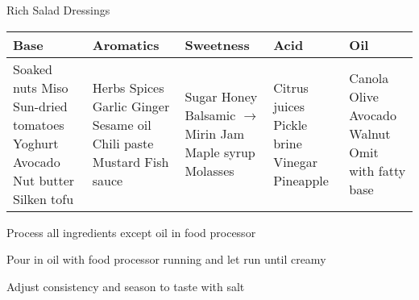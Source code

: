 \begin{densecard}{Rich Salad Dressings}{\vegetarian{}}
\begin{tabularx}{\textwidth}{@{}XXXXX@{}}
\toprule
Base & Aromatics & Sweetness & Acid & Oil \\
\midrule
Soaked nuts\newline
Miso\newline
Sun-dried tomatoes\newline
Yoghurt\newline
Avocado\newline
Nut butter\newline
Silken tofu
& %
Herbs\newline
Spices\newline
Garlic\newline
Ginger\newline
Sesame oil\newline
Chili paste\newline
Mustard\newline
Fish sauce
& %
Sugar\newline
Honey\newline
Balsamic $\rightarrow$\newline
Mirin\newline
Jam\newline
Maple syrup\newline
Molasses
& %
Citrus juices\newline
Pickle brine\newline
Vinegar\newline
Pineapple
& %
Canola\newline
Olive\newline
Avocado\newline
Walnut\newline
Omit with fatty base
\\
\bottomrule
\end{tabularx}
\begin{steps}
\item Process all ingredients except oil in food processor
\item Pour in oil with food processor running and let run until creamy
\item Adjust consistency and season to taste with salt
\end{steps}
\end{densecard}

